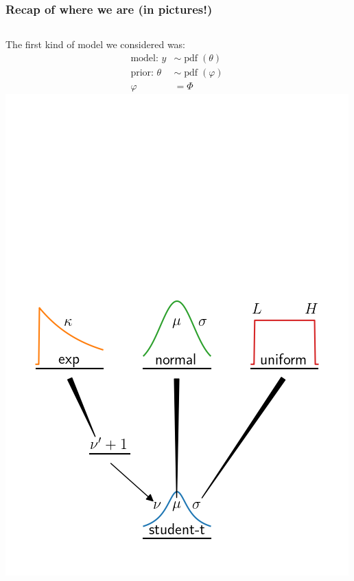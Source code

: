 \documentclass[usenames,dvipsnames,table]{beamer}
\begin{document}
\begin{frame}
\frametitle{Recap of where we are (in pictures!)}
\begin{columns}
The first kind of model we considered was:
\begin{align*}
\textrm{model: } y      &\sim \operatorname{pdf}(\theta) \\
\textrm{prior: } \theta &\sim \operatorname{pdf}(\varphi) \\
                   \varphi &= \varPhi
\end{align*}
\includegraphics[width=\textwidth]{img/progress-base}
\end{columns}
\end{frame}
\end{document}
